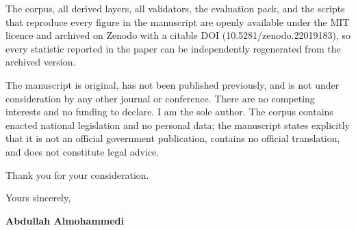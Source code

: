 \documentclass[10.5pt]{letter}
\begin{document}
\vspace{0.5em}
The corpus, all derived layers, all validators, the evaluation pack, and the
scripts that reproduce every figure in the manuscript are openly available
under the MIT licence and archived on Zenodo with a citable DOI
(10.5281/zenodo.22019183), so every statistic reported in the paper can be
independently regenerated from the archived version.

\vspace{0.5em}
The manuscript is original, has not been published previously, and is not
under consideration by any other journal or conference. There are no
competing interests and no funding to declare. I am the sole author. The
corpus contains enacted national legislation and no personal data; the
manuscript states explicitly that it is not an official government
publication, contains no official translation, and does not constitute legal
advice.

\vspace{0.5em}
Thank you for your consideration.

\vspace{0.9em}
\noindent Yours sincerely,

\vspace{1em}
\noindent\textbf{Abdullah Almohammedi}
\end{document}
